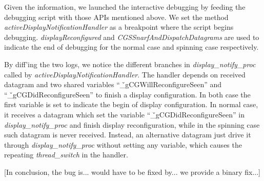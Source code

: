 Given the information, we launched the interactive debugging by 
feeding the debugging script with those APIs mentioned above. We set the method
\textit{activeDisplayNotificationHandler} as a breakpoint where the script begins
debugging. \textit{displayReconfigured} and \textit{CGSSnarfAndDispatchDatagrams}
are used to indicate the end of debugging for the normal case and spinning case
respectively.

By diff'ing the two logs, we notice the different
branches in \textit{display\_notify\_proc} called by
\textit{activeDisplayNotificationHandler}. The handler depends on received
datagram and two shared variables ``\v{\_gCGWillReconfigureSeen}'' and
``\v{\_gCGDidReconfigureSeen}'' to finish a display configuration. In
both case the first variable is set to indicate the begin of display
configuration. In normal case, it receives a datagram which set the variable
``\v{\_gCGDidReconfigureSeen}'' in \textit{display\_notify\_proc} and
finish display reconfiguration, while in the spinning case such datagram
is never received. Instead, an alternative datagram just drive it through
\textit{display\_notify\_proc} without setting any variable, which causes the
repeating \textit{thread\_switch} in the handler.

[In conclusion, the bug is... would have to be fixed by... we provide a binary fix...]
